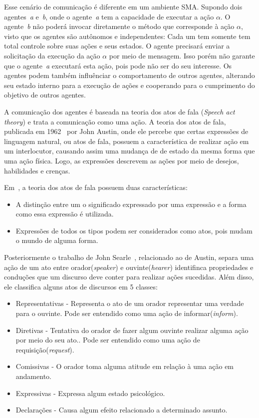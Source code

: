 Esse cenário de comunicação é diferente em um ambiente SMA. Supondo dois agentes~\emph{a} e~\emph{b}, onde o agente~\emph{a} tem a capacidade de executar a ação $\alpha$. O agente~\emph{b} não poderá invocar diretamente o método que corresponde à ação $\alpha$, visto que os agentes são autônomos e independentes: Cada um tem somente tem total controle sobre suas ações e seus estados. O agente precisará enviar a solicitação da execução da ação $\alpha$ por meio de mensagem. Isso porém não garante que o agente~\emph{a} executará esta ação, pois pode não ser do seu interesse. Os agentes podem também influênciar o comportamento de outros agentes, alterando seu estado interno para a execução de ações e cooperando para o cumprimento do objetivo de outros agentes.

A comunicação dos agentes é baseada na teoria dos atos de fala (\emph{Speech act theory}) e trata a comunicação como uma ação. A teoria dos atos de fala, publicada em 1962~\cite{austin62} por John Austin, onde ele percebe que certas expressões de linguagem natural, ou atos de fala, possuem a característica de realizar ação em um interlocutor, causando assim uma mudança de de estado da mesma forma que uma ação física. Logo, as expressões descrevem as ações por meio de desejos, habilidades e crenças.

Em~\cite{verschueren09}, a teoria dos atos de fala possuem duas características:
\begin{itemize}
	\item A distinção entre um o significado expressado por uma expressão e a forma como essa expressão é utilizada.
	\item Expressões de todos os tipos podem ser considerados como atos, pois mudam o mundo de alguma forma.
\end{itemize}

Posteriormente o trabalho de John Searle~\cite{searle69}, relacionado ao de Austin, separa uma ação de um ato entre orador(\emph{speaker}) e ouvinte(\emph{hearer}) identifinca propriedades e conduções que um discurso deve conter para realizar ações sucedidas. Além disso, ele classifica alguns atos de discursos em 5 classes:
\begin{itemize}
	\item Representativas - Representa o ato de um orador representar uma verdade para o ouvinte. Pode ser entendido como uma ação de informar(\emph{inform}).
	\item Diretivas - Tentativa do orador de fazer algum ouvinte realizar alguma ação por meio do seu ato.. Pode ser entendido como uma ação de requisição(\emph{request}).
	\item Comissivas - O orador toma alguma atitude em relação à uma ação em andamento.
	\item Expressivas - Expressa algum estado psicológico.
	\item Declarações - Causa algum efeito relacionado a determinado assunto.
\end{itemize}

